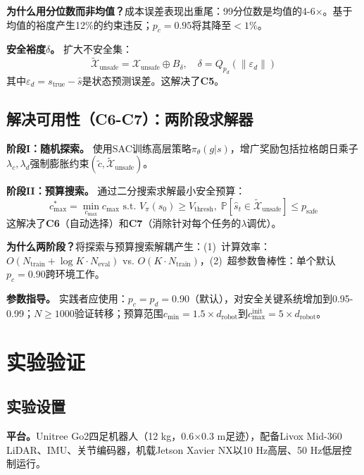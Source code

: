 \documentclass{article}
\begin{document}
\textbf{为什么用分位数而非均值？}成本误差表现出重尾：99分位数是均值的4-6$\times$。基于均值的裕度产生12\%的约束违反；$p_c=0.95$将其降至$<1\%$。

\textbf{安全裕度$\delta$。}
扩大不安全集：
\begin{equation}
\tilde{\mathcal{X}}_{\text{unsafe}} = \mathcal{X}_{\text{unsafe}} \oplus B_{\delta}, \quad \delta = Q_{p_d}(\|\varepsilon_d\|)
\end{equation}
其中$\varepsilon_d=s_{\text{true}}-\hat{s}$是状态预测误差。这解决了\textbf{C5}。

\subsection{解决可用性（C6-C7）：两阶段求解器}
\label{sec:usability}

\textbf{阶段I：随机探索。}
使用SAC训练高层策略$\pi_{\theta}(g|s)$，增广奖励包括拉格朗日乘子$\lambda_c,\lambda_d$强制膨胀约束$(\tilde{c}, \tilde{\mathcal{X}}_{\text{unsafe}})$。

\textbf{阶段II：预算搜索。}
通过二分搜索求解最小安全预算：
\begin{equation}
c_{\max}^* = \min_{c_{\max}} c_{\max} \text{ s.t. } V_{\pi}(s_0)\ge V_{\text{thresh}}, \; \mathbb{P}[\hat{s}_t\in\tilde{\mathcal{X}}_{\text{unsafe}}]\le p_{\text{safe}}
\end{equation}
这解决了\textbf{C6}（自动选择）和\textbf{C7}（消除针对每个任务的$\lambda$调优）。

\textbf{为什么两阶段？}将探索与预算搜索解耦产生：(1)~计算效率：$O(N_{\text{train}}+\log K\cdot N_{\text{eval}})$ vs. $O(K\cdot N_{\text{train}})$，(2)~超参数鲁棒性：单个默认$p_c=0.90$跨环境工作。

\textbf{参数指导。}
实践者应使用：$p_c=p_d=0.90$（默认），对安全关键系统增加到0.95-0.99；$N\ge1000$验证转移；预算范围$c_{\min}=1.5\times d_{\text{robot}}$到$c_{\max}^{\text{init}}=5\times d_{\text{robot}}$。

\section{实验验证}
\label{sec:experiments}

\subsection{实验设置}

\textbf{平台。}Unitree Go2四足机器人（12 kg，0.6$\times$0.3 m足迹），配备Livox Mid-360 LiDAR、IMU、关节编码器，机载Jetson Xavier NX以10 Hz高层、50 Hz低层控制运行。
\end{document}
